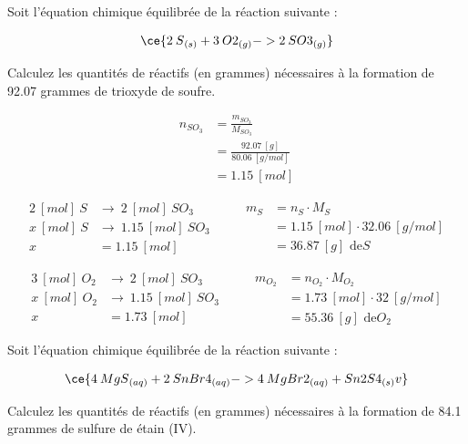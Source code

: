\documentclass[
  11pt,
  french,
  a4paper,
  openany]{book}
\begin{document}
\newpage

\begin{Exercise}

Soit l'équation chimique équilibrée de la réaction suivante :

\[ \ce{ 2\:S{}_{(s)} + 3\:O2{}_{(g)} -> 2\:SO3{}_{(g)} } \]

Calculez les quantités de réactifs (en grammes) nécessaires à la formation de 92.07 grammes de trioxyde de soufre.



\end{Exercise}

\begin{Answer}
\[ \begin{split}
    n_{SO_{3}} &= \frac{m_{SO_{3}}}{M_{SO_{3}}} \\
    &= \frac{92.07\ [g]}{80.06\ [g/mol]} \\
    &= 1.15\ [mol]
    \end{split} \]

\[ \begin{split}
  2\ [mol]\ S &\rightarrow\ 2\ [mol]\ SO_{3} \\
  x\ [mol]\ S &\rightarrow\ 1.15\ [mol]\ SO_{3} \\
  x &= 1.15\ [mol]
  \end{split}
    \qquad
    \begin{split}
    m_{S} &= n_{S} \cdot M_{S} \\
  &= 1.15\ [mol] \cdot 32.06\ [g/mol] \\
  &= 36.87\ [g] \text{ de} S
  \end{split} \]

\[ \begin{split}
    3\ [mol]\ O_2 &\rightarrow\ 2\ [mol]\ SO_{3} \\
    x\ [mol]\ O_2 &\rightarrow\ 1.15\ [mol]\ SO_{3} \\
    x &= 1.73\ [mol]
    \end{split}
    \qquad
    \begin{split}
    m_{O_{2}} &= n_{O_{2}} \cdot M_{O_{2}} \\
    &= 1.73\ [mol] \cdot 32\ [g/mol] \\
    &= 55.36\ [g] \text{ de} O_{2}
  \end{split} \]

\end{Answer}

\begin{Exercise}

Soit l'équation chimique équilibrée de la réaction suivante :

\[ \ce{ 4\:MgS{}_{(aq)} + 2\:SnBr4{}_{(aq)} -> 4\:MgBr2{}_{(aq)} + Sn2S4{}_{(s)} v } \]

Calculez les quantités de réactifs (en grammes) nécessaires à la formation de 84.1 grammes de sulfure de étain (IV).



\end{Exercise}
\end{document}
